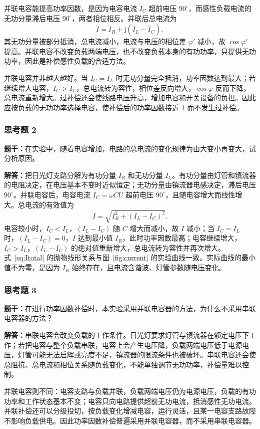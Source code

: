 \documentclass{Phyport}
\begin{document}
并联电容能提高功率因数，是因为电容电流 $\dot I_C$ 超前电压 $90^\circ$，而感性负载电流的无功分量滞后电压 $90^\circ$，两者相位相反。并联后总电流为
\begin{equation}
    \dot I=\dot I_R+\mathrm{j}(\dot I_L-\dot I_C),
\end{equation}
其无功分量被部分抵消，总电流减小，电流与电压的相位差 $\varphi'$ 减小，故 $\cos\varphi'$ 提高。并联电容不改变负载两端电压，也不改变负载本身的有功功率，只提供无功功率，因此是补偿感性负载的合适方法。

并联电容并非越大越好。当 $I_C=I_L$ 时无功分量完全抵消，功率因数达到最大；若继续增大电容，$I_C>I_L$，总电流转为容性，相位差反向增大，$\cos\varphi$ 反而下降，总电流重新增大。过补偿还会使线路电压升高，增加电容和开关设备的负担。因此应按负载的无功功率选择电容，使补偿后的功率因数接近 1 而不发生过补偿。

\subsubsection{思考题 2}
\textbf{题干：}在实验中，随着电容增加，电路的总电流的变化规律为由大变小再变大，试分析原因。

\textbf{解答：}把日光灯支路分解为有功分量 $I_R$ 和无功分量 $I_L$。有功分量由灯管和镇流器的电阻决定，在电压基本不变时近似恒定；无功分量由镇流器电感决定，滞后电压 $90^\circ$。并联电容后，电容电流 $I_C=\omega CU$ 超前电压 $90^\circ$，且随电容增大而线性增大。总电流的有效值为
\begin{equation}
    I=\sqrt{I_R^2+(I_L-I_C)^2}.
    \label{eq:Itotal}
\end{equation}
电容较小时，$I_C<I_L$，$(I_L-I_C)$ 随 $C$ 增大而减小，故 $I$ 减小；当 $I_C=I_L$ 时，$(I_L-I_C)=0$，$I$ 达到最小值 $I_R$，此时功率因数最高；电容继续增大，$I_C>I_L$，$(I_L-I_C)$ 的绝对值重新增大，总电流转为容性并再次增大。式~\eqref{eq:Itotal} 的抛物线形关系与图~\ref{fig:current} 的实验曲线一致。实际曲线的最小值不为零，是因为 $I_R$ 始终存在，且电流含谐波、灯管参数随电压变化。

\subsubsection{思考题 3}
\textbf{题干：}在进行功率因数补偿时，本实验采用并联电容器的方法，为什么不采用串联电容器的方法？

\textbf{解答：}串联电容会改变负载的工作条件。日光灯要求灯管与镇流器在额定电压下工作；若把电容与整个负载串联，电容上会产生电压降，负载两端电压低于电源电压，灯管可能无法启辉或亮度不足，镇流器的限流条件也被破坏。串联电容还会使总阻抗、总电流和相位关系随负载变化，不能单独调节无功功率，补偿量难以控制。

并联电容则不同：电容支路与负载并联，负载两端电压仍为电源电压，负载的有功功率和工作状态基本不变；电容只向电路提供超前无功电流，抵消感性无功电流。并联补偿还可以分级投切，按负载变化增减电容，运行灵活，且某一电容支路故障不影响负载供电。因此功率因数补偿普遍采用并联电容器，而不采用串联电容器。


\end{document}
